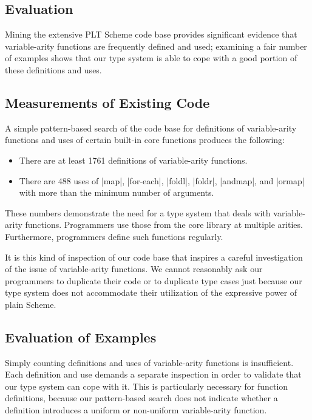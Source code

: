 \begin{schemeregion}

\section{Evaluation}
\label{sec:eval}

Mining the extensive PLT Scheme code base
 provides significant evidence that variable-arity functions are
frequently defined and used; examining a fair number of examples shows
that our type system is able to cope with a good portion of
these definitions and uses.

\subsection{Measurements of Existing Code}

A simple pattern-based search of the code base for definitions of
 variable-arity functions and uses of certain built-in core functions
 produces the following:
\begin{itemize}
\item There are at least 1761 definitions of variable-arity functions.  

\item There are 488 uses of 
  \scheme|map|, \scheme|for-each|, \scheme|foldl|, \scheme|foldr|,
  \scheme|andmap|, and \scheme|ormap| with more than the minimum number
  of arguments.

\end{itemize}
 
These numbers demonstrate the need for a type system that deals
 with variable-arity functions. Programmers use those from the core
 library at multiple arities. Furthermore, programmers define
 such functions regularly.

It is this kind of inspection of our code base that inspires a careful
 investigation of the issue of variable-arity functions. We cannot reasonably
 ask our programmers to duplicate their code or to duplicate type cases
 just because our type system does not accommodate their utilization of the
 expressive power of plain Scheme. 

\subsection{Evaluation of Examples}

Simply counting definitions and uses of variable-arity functions is
 insufficient.  Each definition and use demands a separate inspection in order
 to validate that our type system can cope with it. This is particularly
 necessary for function definitions, because our pattern-based search does
 not indicate whether a definition introduces a uniform or non-uniform
 variable-arity function. 


\end{schemeregion}
